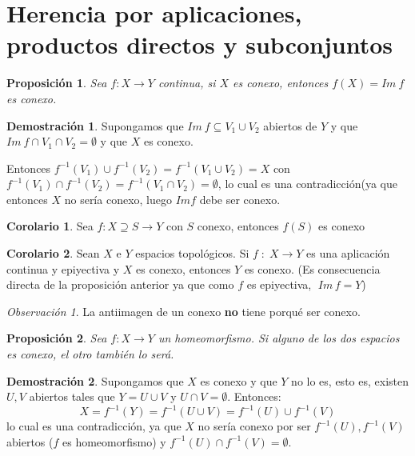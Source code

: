\documentclass[12pt,twoside]{report}
\theoremstyle{azul}
\theoremstyle{azul2}
\theoremstyle{plain}
\newtheorem*{prop}{Proposición}
\theoremstyle{definition}
\newtheorem*{dem}{Demostración}
\newtheorem*{cor}{Corolario}
\theoremstyle{remark}
\newtheorem*{obs}{Observación}
\begin{document}
\section{{Herencia por aplicaciones, productos directos y subconjuntos}}

\begin{prop}
Sea $f: X \longrightarrow Y$ continua, si $X$ es conexo, entonces $f(X)=Im\: f$ es conexo.
\end{prop}
\begin{dem}
Supongamos que $Im \: f \subseteq V_1\cup V_2$ abiertos de $Y$ y que $Im\: f \cap V_1 \cap V_2 = \emptyset$ y que $X$ es conexo.

Entonces $f^{-1}(V_1) \cup f^{-1}(V_2)=f^{-1}(V_1 \cup V_2)=X$ con $f^{-1}(V_1)\cap f^{-1}(V_2)=f^{-1}(V_1 \cap V_2)= \emptyset$, lo cual es una contradicción(ya que entonces $X$ no sería conexo, luego $Im f$ debe ser conexo. 
\end{dem}
\begin{cor}
Sea $f: X \supseteq S \longrightarrow Y$ con $S$ conexo, entonces $f(S)$ es conexo
\end{cor}
\begin{cor}
Sean $X$ e $Y$ espacios topológicos. Si $f\;:\;X \longrightarrow Y$ es una aplicación continua y epiyectiva y $X$ es conexo, entonces $Y$ es conexo. (Es consecuencia directa de la proposición anterior ya que como $f$ es epiyectiva, $\; Im\,f = Y$)
\end{cor}
\begin{obs}
La antiimagen de un conexo \textbf{no} tiene porqué ser conexo.
\end{obs}
\begin{prop}
Sea $f:X\longrightarrow Y$ un homeomorfismo. Si alguno de los dos espacios es conexo, el otro también lo será.
\end{prop}
\begin{dem}
Supongamos que $X$ es conexo y que $Y$ no lo es, esto es, existen $U,V$ abiertos tales que $Y=U\cup V$ y $U\cap V=\emptyset$. Entonces:
$$X=f^{-1}(Y)=f^{-1}(U\cup V)=f^{-1}(U)\cup f^{-1}(V)$$
lo cual es una contradicción, ya que $X$ no sería conexo por ser $f^{-1}(U),f^{-1}(V)$ abiertos ($f$ es homeomorfismo) y $f^{-1}(U)\cap f^{-1}(V)=\emptyset$.
\end{dem}
\end{document}
